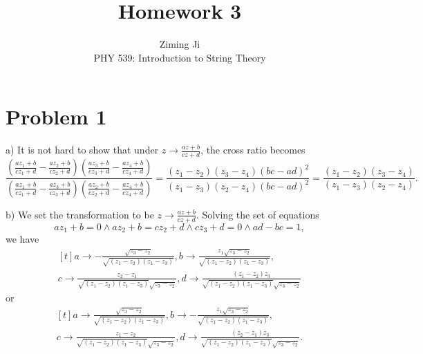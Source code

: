 \documentclass[12pt]{article}
\begin{document}
 
\title{Homework 3}
\author{Ziming Ji\\ 
PHY 539: Introduction to String Theory}
 
\maketitle
 
\section{Problem 1} 
\begin{paragraph}{a)}
It is not hard to show that under $z\to \frac{a z+b}{c z+d}$, the cross ratio becomes
\begin{equation}
\frac{\left(\frac{a z_1+b}{c z_1+d}-\frac{a z_2+b}{c z_2+d}\right) \left(\frac{a z_3+b}{c z_3+d}-\frac{a z_4+b}{c z_4+d}\right)}{\left(\frac{a z_1+b}{c z_1+d}-\frac{a z_3+b}{c z_3+d}\right) \left(\frac{a z_2+b}{c z_2+d}-\frac{a z_4+b}{c z_4+d}\right)}=\frac{\left(z_1-z_2\right) \left(z_3-z_4\right) (b c-a d)^2}{\left(z_1-z_3\right) \left(z_2-z_4\right) (b c-a d)^2}=\frac{\left(z_1-z_2\right) \left(z_3-z_4\right)}{\left(z_1-z_3\right) \left(z_2-z_4\right)}.
\end{equation}
\end{paragraph}
\begin{paragraph}{b)}
We set the transformation to be $z\to \frac{a z+b}{c z+d}$. Solving the set of equations
\begin{equation}
a z_1+b=0\land a z_2+b=c z_2+d\land c z_3+d=0\land a d-b c=1,
\end{equation}
we have 
\begin{equation}
\begin{aligned}[t]
a\to -\frac{\sqrt{z_3-z_2}}{\sqrt{\left(z_1-z_2\right) \left(z_1-z_3\right)}},b\to \frac{z_1 \sqrt{z_3-z_2}}{\sqrt{\left(z_1-z_2\right) \left(z_1-z_3\right)}},\\
c\to \frac{z_2-z_1}{\sqrt{\left(z_1-z_2\right) \left(z_1-z_3\right)} \sqrt{z_3-z_2}},d\to \frac{\left(z_1-z_2\right) z_3}{\sqrt{\left(z_1-z_2\right) \left(z_1-z_3\right)} \sqrt{z_3-z_2}}
\end{aligned}
\end{equation}
or
\begin{equation}
\begin{aligned}[t]
a\to \frac{\sqrt{z_3-z_2}}{\sqrt{\left(z_1-z_2\right) \left(z_1-z_3\right)}},b\to -\frac{z_1 \sqrt{z_3-z_2}}{\sqrt{\left(z_1-z_2\right) \left(z_1-z_3\right)}},\\
c\to \frac{z_1-z_2}{\sqrt{\left(z_1-z_2\right) \left(z_1-z_3\right)} \sqrt{z_3-z_2}},d\to \frac{\left(z_2-z_1\right) z_3}{\sqrt{\left(z_1-z_2\right) \left(z_1-z_3\right)} \sqrt{z_3-z_2}}.
\end{aligned}
\end{equation}
\end{paragraph}
\end{document}
